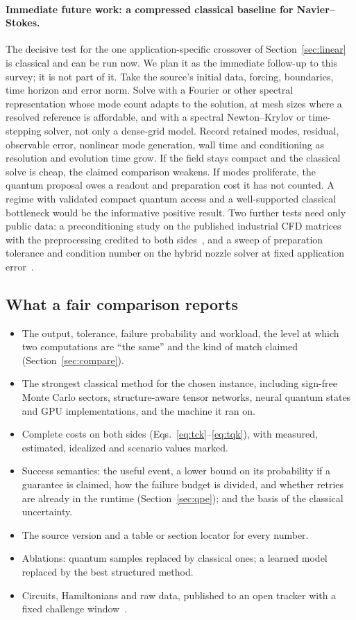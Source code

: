 \paragraph{Immediate future work: a compressed classical baseline for Navier--Stokes.} The decisive test for the one application-specific crossover of Section~\ref{sec:linear} is classical and can be run now. We plan it as the immediate follow-up to this survey; it is not part of it. Take the source's initial data, forcing, boundaries, time horizon and error norm. Solve with a Fourier or other spectral representation whose mode count adapts to the solution, at mesh sizes where a resolved reference is affordable, and with a spectral Newton--Krylov or time-stepping solver, not only a dense-grid model. Record retained modes, residual, observable error, nonlinear mode generation, wall time and conditioning as resolution and evolution time grow. If the field stays compact and the classical solve is cheap, the claimed comparison weakens. If modes proliferate, the quantum proposal owes a readout and preparation cost it has not counted. A regime with validated compact quantum access and a well-supported classical bottleneck would be the informative positive result. Two further tests need only public data: a preconditioning study on the published industrial CFD matrices with the preprocessing credited to both sides~\cite{lapworth2025}, and a sweep of preparation tolerance and condition number on the hybrid nozzle solver at fixed application error~\cite{goldfriend2026}.

\subsection{What a fair comparison reports}
\begin{itemize}
\item The output, tolerance, failure probability and workload, the level at which two computations are ``the same'' and the kind of match claimed (Section~\ref{sec:compare}).
\item The strongest classical method for the chosen instance, including sign-free Monte Carlo sectors, structure-aware tensor networks, neural quantum states and GPU implementations, and the machine it ran on.
\item Complete costs on both sides (Eqs.~\ref{eq:tck}--\ref{eq:tqk}), with measured, estimated, idealized and scenario values marked.
\item Success semantics: the useful event, a lower bound on its probability if a guarantee is claimed, how the failure budget is divided, and whether retries are already in the runtime (Section~\ref{sec:qpe}); and the basis of the classical uncertainty.
\item The source version and a table or section locator for every number.
\item Ablations: quantum samples replaced by classical ones; a learned model replaced by the best structured method.
\item Circuits, Hamiltonians and raw data, published to an open tracker with a fixed challenge window~\cite{pq_ibm3}.
\end{itemize}

